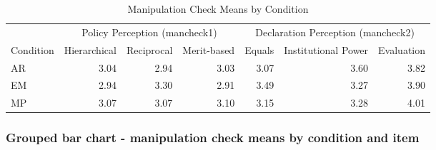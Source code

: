\documentclass[
]{article}
\begin{document}
\begin{table}[t]
\caption*{
{\fontsize{20}{25}\selectfont  Manipulation Check Means by Condition\fontsize{12}{15}\selectfont }
} 
\fontsize{12.0pt}{14.0pt}\selectfont
\begin{tabular*}{\linewidth}{@{\extracolsep{\fill}}lrrrrrr}
\toprule
 & \multicolumn{3}{c}{{Policy Perception (mancheck1)}} & \multicolumn{3}{c}{{Declaration Perception (mancheck2)}} \\ 
\cmidrule(lr){2-4} \cmidrule(lr){5-7}
Condition & Hierarchical & Reciprocal & Merit-based & Equals & Institutional Power & Evaluation \\ 
\midrule\addlinespace[2.5pt]
AR & 3.04 & 2.94 & 3.03 & 3.07 & 3.60 & 3.82 \\ 
EM & 2.94 & 3.30 & 2.91 & 3.49 & 3.27 & 3.90 \\ 
MP & 3.07 & 3.07 & 3.10 & 3.15 & 3.28 & 4.01 \\ 
\bottomrule
\end{tabular*}
\end{table}

\subsubsection{Grouped bar chart - manipulation check means by condition
and
item}\label{grouped-bar-chart---manipulation-check-means-by-condition-and-item}
\end{document}
